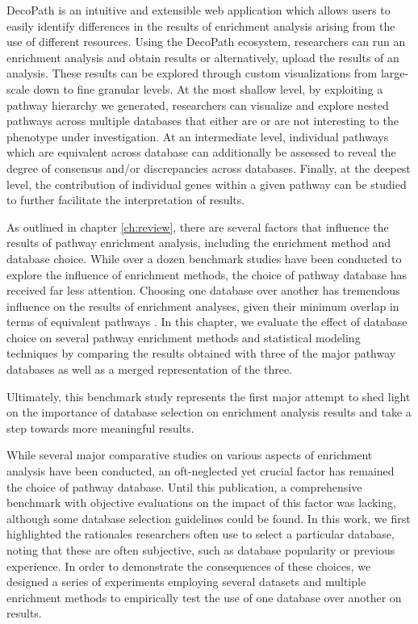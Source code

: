 DecoPath is an intuitive and extensible web application which allows users to easily identify differences in the results of enrichment analysis arising from the use of different resources. Using the DecoPath ecosystem, researchers can run an enrichment analysis and obtain results or alternatively, upload the results of an analysis. These results can be explored through custom visualizations from large-scale down to fine granular levels. At the most shallow level, by exploiting a pathway hierarchy we generated, researchers can visualize and explore nested pathways across multiple databases that either are or are not interesting to the phenotype under investigation. At an intermediate level, individual pathways which are equivalent across database can additionally be assessed to reveal the degree of consensus and/or discrepancies across databases. Finally, at the deepest level, the contribution of individual genes within a given pathway can be studied to further facilitate the interpretation of results.

As outlined in chapter \ref{ch:review}, there are several factors that influence the results of pathway enrichment analysis, including the enrichment method and database choice. While over a dozen benchmark studies have been conducted to explore the influence of enrichment methods, the choice of pathway database has received far less attention. Choosing one database over another has tremendous influence on the results of enrichment analyses, given their minimum overlap in terms of equivalent pathways \parencite{domingo2019}. In this chapter, we evaluate the effect of database choice on several pathway enrichment methods and statistical modeling techniques by comparing the results obtained with three of the major pathway databases as well as a merged representation of the three. 

Ultimately, this benchmark study represents the first major attempt to shed light on the importance of database selection on enrichment analysis results and take a step towards more meaningful results.

While several major comparative studies on various aspects of enrichment analysis have been conducted, an oft-neglected yet crucial factor has remained the choice of pathway database. Until this publication, a comprehensive benchmark with objective evaluations on the impact of this factor was lacking, although some database selection guidelines could be found. In this work, we first highlighted the rationales researchers often use to select a particular database, noting that these are often subjective, such as database popularity or previous experience. In order to demonstrate the consequences of these choices, we designed a series of experiments employing several datasets and multiple enrichment methods to empirically test the use of one database over another on results. 

